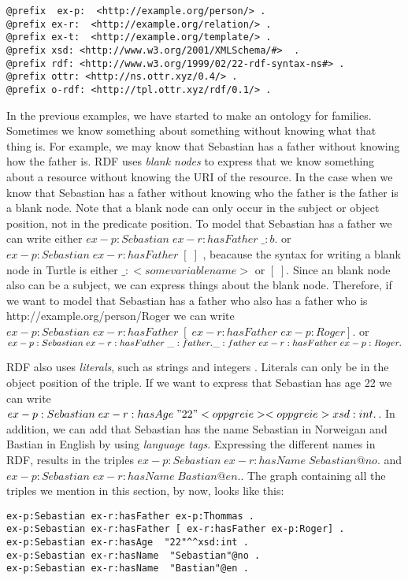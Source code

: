 \begin{lstlisting}[frame=single, language=turtle]
@prefix  ex-p:  <http://example.org/person/> . 
@prefix ex-r:  <http://example.org/relation/> . 
@prefix ex-t:  <http://example.org/template/> . 
@prefix xsd: <http://www.w3.org/2001/XMLSchema/#>  . 
@prefix rdf: <http://www.w3.org/1999/02/22-rdf-syntax-ns#> .
@prefix ottr: <http://ns.ottr.xyz/0.4/> .
@prefix o-rdf: <http://tpl.ottr.xyz/rdf/0.1/> .
\end{lstlisting}

\para
In the previous examples, we have started to make an ontology for families. Sometimes we know something about something without knowing what that thing is. For example, we may know that Sebastian has a father without knowing how the father is. RDF uses \emph{blank nodes} to express that we know something about a resource without knowing the URI of the resource. In the case when we know that Sebastian has a father without knowing who the father is the father is a blank node. Note that a blank node can only  occur in the subject or object position, not in the predicate position. To model that Sebastian has a father we can write either $ex-p:Sebastian\; ex-r:hasFather\; \_:b .$ or $ex-p:Sebastian\; ex-r:hasFather\; [\; ]$ , beacause the syntax for writing a blank node in Turtle is either $\_:<some variable name>$ or $[\; ]$. Since an blank node also can be a subject, we can express things about the blank node. Therefore, if we want to model that Sebastian has a father who also has a father who is http://example.org/person/Roger we can write $ex-p:Sebastian\; ex-r:hasFather\; [\; ex-r:hasFather\; ex-p:Roger] .$ or $ex-p:Sebastian\; ex-r:hasFather\; \_:father . \\ \_:father \; ex-r:hasFather\; ex-p:Roger .$

\para
RDF also uses \emph{literals}, such as strings and integers \autocite{W3C_RDF}. Literals can only be in the object position of the triple. If we want to express that Sebastian has age 22 we can write $ex-p:Sebastian\; ex-r:hasAge\; " 22 " <opp greie> <opp greie> xsd:int.$. In addition, we can add that Sebastian has the name Sebastian in Norweigan and Bastian in English by using \emph{language tags}. Expressing the different names in RDF, results in the triples $ex-p:Sebastian\; ex-r:hasName\; Sebastian@no.$ and $ex-p:Sebastian\; ex-r:hasName\; Bastian@en.$. The graph containing all the triples we mention in this section, by now, looks like this:

\begin{lstlisting}[frame=single, language=turtle]
ex-p:Sebastian ex-r:hasFather ex-p:Thommas .
ex-p:Sebastian ex-r:hasFather [ ex-r:hasFather ex-p:Roger] . 
ex-p:Sebastian ex-r:hasAge  "22"^^xsd:int . 
ex-p:Sebastian ex-r:hasName  "Sebastian"@no . 
ex-p:Sebastian ex-r:hasName  "Bastian"@en .
\end{lstlisting}

